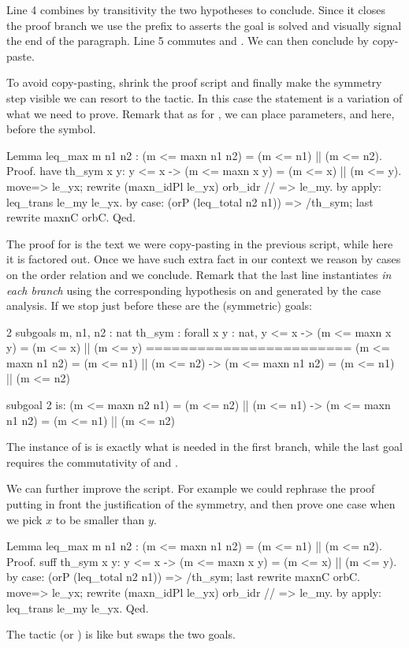 Line 4 combines by transitivity the two hypotheses to conclude.  Since it closes the
proof branch we use the prefix  to asserts the goal is solved and
visually signal the end of the paragraph.  Line 5 commutes  and \C{||}.
We can then conclude by copy-paste.


To avoid copy-pasting, shrink the proof script and finally make the
symmetry step visible we can resort to the  tactic.
In this case the statement is a variation of what we need to prove.
Remark that as for , we can place parameters,  and 
here, before the \C{:} symbol.

\begin{coq}{}{}
Lemma leq_max m n1 n2 : (m <= maxn n1 n2) = (m <= n1) || (m <= n2).
Proof.
have th_sym x y: y <= x -> (m <= maxn x y) = (m <= x) || (m <= y).
  move=> le_yx; rewrite (maxn_idPl le_yx) orb_idr // => le_my.
  by apply: leq_trans le_my le_yx.
by case: (orP (leq_total n2 n1)) => /th_sym; last rewrite maxnC orbC.
Qed.
\end{coq}

The proof for  is the text we were copy-pasting in the
previous script, while here it is factored out.
Once we have such extra fact in our context we reason by cases on
the order relation and we conclude.  Remark that the last line instantiates
 \emph{in each branch} using the corresponding
hypothesis on  and  generated by the case analysis.
If we stop just before  these are the (symmetric)
goals:

\begin{coqout}{}{}
2 subgoals
m, n1, n2 : nat
th_sym : forall x y : nat,
         y <= x -> (m <= maxn x y) = (m <= x) || (m <= y)
========================
(m <= maxn n1 n2) = (m <= n1) || (m <= n2) ->
(m <= maxn n1 n2) = (m <= n1) || (m <= n2)

subgoal 2 is:
(m <= maxn n2 n1) = (m <= n2) || (m <= n1) ->
(m <= maxn n1 n2) = (m <= n1) || (m <= n2)
\end{coqout}
The instance of  is is exactly what is needed in the
first branch, while the last goal requires the commutativity of
 and \C{||}.

We can further improve the script.  For example we could rephrase
the proof putting in front the justification of the symmetry, and
then prove one case when we pick $x$ to be smaller than $y$.

\begin{coq}{}{}
Lemma leq_max m n1 n2 : (m <= maxn n1 n2) = (m <= n1) || (m <= n2).
Proof.
suff th_sym x y: y <= x -> (m <= maxn x y) = (m <= x) || (m <= y).
  by case: (orP (leq_total n2 n1)) => /th_sym; last rewrite maxnC orbC.
move=> le_yx; rewrite (maxn_idPl le_yx) orb_idr // => le_my.
by apply: leq_trans le_my le_yx.
Qed.
\end{coq}
The  tactic (or )
is like  but swaps the two goals.

